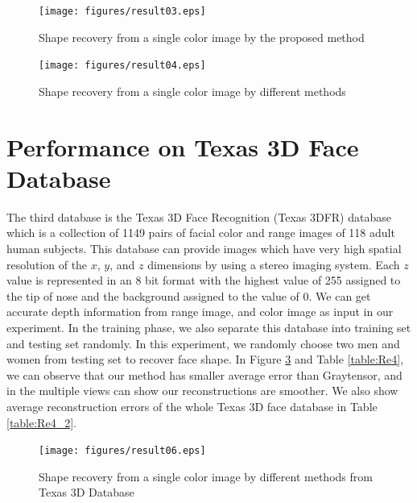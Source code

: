 



\begin{figure}
\begin{center}

  \texttt{[image: figures/result03.eps]}
  \caption{Shape recovery from a single color image by the proposed method}
  \label{fig:result03}

\end{center}
\end{figure}


\begin{figure}
\begin{center}

  \texttt{[image: figures/result04.eps]}
  \caption{Shape recovery from a single color image by different methods}
  \label{fig:result04}

\end{center}
\end{figure}


\section{Performance on Texas 3D Face Database}

The third database is the Texas 3D Face Recognition (Texas 3DFR) database \cite{gupta2010anthropometric,gupta2010texas,Texas3DFace} which is a collection of 1149 pairs of facial color and range images of 118 adult human subjects. 
This database can provide images which have very high spatial resolution of the $x$, $y$, and $z$ dimensions by using a stereo imaging system. 
Each $z$ value is represented in an 8 bit format with the highest value of 255 assigned to the tip of nose and the background assigned to the value of 0.
We can get accurate depth information from range image, and color image as input in our experiment. 
In the training phase, we also separate this database into training set and testing set randomly. 
In this experiment, we randomly choose two men and women from testing set to recover face shape. 
In Figure \ref{fig:result06} and Table \ref{table:Re4}, we can observe that our method has smaller average error than Graytensor, and in the multiple views can show our reconstructions are smoother. 
We also show average reconstruction errors of the whole Texas 3D face database in Table \ref{table:Re4_2}.



\begin{figure}
\begin{center}

  \texttt{[image: figures/result06.eps]}
  \caption{Shape recovery from a single color image by different methods from Texas 3D         Database}
  \label{fig:result06}

\end{center}
\end{figure}

